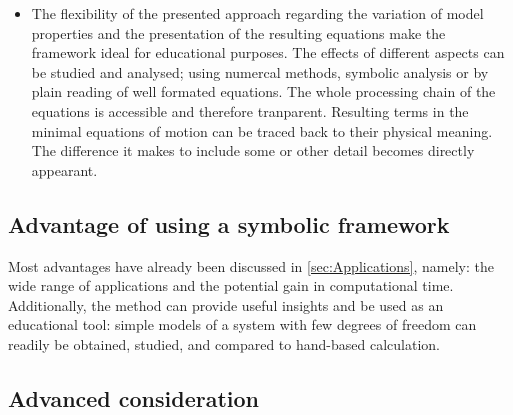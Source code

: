 \documentclass[wes, manuscript]{copernicus}
\begin{document}
\begin{itemize}
\item The flexibility of the presented approach regarding the variation of model properties and the presentation of the resulting equations make the framework ideal for educational purposes. The effects of different aspects can be studied and analysed; using numercal methods, symbolic analysis or by plain reading of well formated \Latex equations. The whole processing chain of the equations is accessible and therefore tranparent. Resulting terms in the minimal equations of motion can be traced back to their physical meaning. The difference it makes to include some or other detail becomes directly appearant.
\end{itemize}


\subsection{Advantage of using a symbolic framework}
\label{sec:Advantages}
Most advantages have already been discussed in \autoref{sec:Applications}, namely: the wide range of applications and the potential gain in computational time.
Additionally, the method can provide useful insights and be used as an educational tool: simple models of a system with few degrees of freedom can readily be obtained, studied, and compared to hand-based calculation.


\subsection{Advanced consideration}
\label{sec:AdvancedConsiderations}
\end{document}
